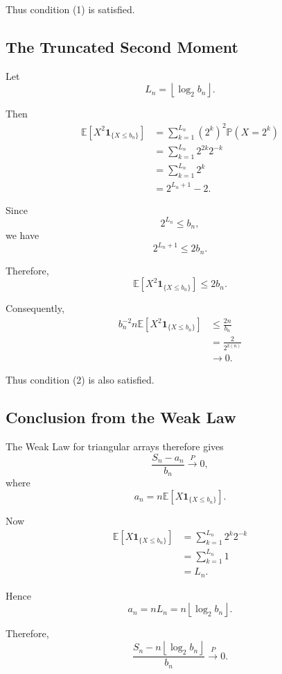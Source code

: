 Thus condition (1) is satisfied.

\subsection{The Truncated Second Moment}

Let
\[
L_n
=
\left\lfloor
\log_2 b_n
\right\rfloor.
\]

Then
\[
\begin{aligned}
\mathbb{E}
\left[
X^2\mathbf{1}_{\{X\leq b_n\}}
\right]
&=
\sum_{k=1}^{L_n}
(2^k)^2\mathbb{P}(X=2^k)\\
&=
\sum_{k=1}^{L_n}
2^{2k}2^{-k}\\
&=
\sum_{k=1}^{L_n}2^k\\
&=
2^{L_n+1}-2.
\end{aligned}
\]

Since
\[
2^{L_n}\leq b_n,
\]
we have
\[
2^{L_n+1}\leq2b_n.
\]

Therefore,
\[
\mathbb{E}
\left[
X^2\mathbf{1}_{\{X\leq b_n\}}
\right]
\leq
2b_n.
\]

Consequently,
\[
\begin{aligned}
b_n^{-2}n
\mathbb{E}
\left[
X^2\mathbf{1}_{\{X\leq b_n\}}
\right]
&\leq
\frac{2n}{b_n}\\
&=
\frac{2}{2^{k(n)}}\\
&\longrightarrow0.
\end{aligned}
\]

Thus condition (2) is also satisfied.

\subsection{Conclusion from the Weak Law}

The Weak Law for triangular arrays therefore gives
\[
\frac{S_n-a_n}{b_n}
\xrightarrow{P}0,
\]
where
\[
a_n
=
n\mathbb{E}
\left[
X\mathbf{1}_{\{X\leq b_n\}}
\right].
\]

Now
\[
\begin{aligned}
\mathbb{E}
\left[
X\mathbf{1}_{\{X\leq b_n\}}
\right]
&=
\sum_{k=1}^{L_n}
2^k2^{-k}\\
&=
\sum_{k=1}^{L_n}1\\
&=
L_n.
\end{aligned}
\]

Hence
\[
a_n
=
nL_n
=
n
\left\lfloor
\log_2 b_n
\right\rfloor.
\]

Therefore,
\[
\boxed{
\frac{
S_n-
n\left\lfloor\log_2b_n\right\rfloor
}{b_n}
\xrightarrow{P}0.
}
\tag{4}
\]


